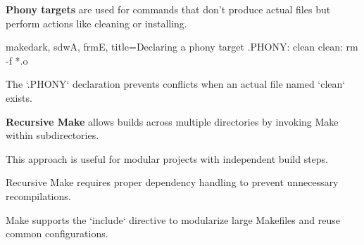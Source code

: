 \begin{NxSSSSBox}
	\begin{NxIDBox}
		\textbf{Phony targets} are used for commands that don’t produce actual files but perform actions like cleaning or installing.
	\end{NxIDBox}
\end{NxSSSSBox}

\begin{NxCodeBox}{make}{dark, sdwA, frmE, title={Declaring a phony target}}
	.PHONY: clean
	clean:
		rm -f *.o
\end{NxCodeBox}

\bigskip

\begin{NxSSSSBox}[breakable]
	\begin{NxIDBox}
		The `.PHONY` declaration prevents conflicts when an actual file named `clean` exists.
	\end{NxIDBox}
\end{NxSSSSBox}

\begin{NxSSSSBox}
	\begin{NxIDBox}
		\textbf{Recursive Make} allows builds across multiple directories by invoking Make within subdirectories.
	\end{NxIDBox}
	\begin{NxIDBox}
		This approach is useful for modular projects with independent build steps.
	\end{NxIDBox}
\end{NxSSSSBox}


\bigskip

\begin{NxSSSSBox}[breakable]
	\begin{NxIDBox}
		Recursive Make requires proper dependency handling to prevent unnecessary recompilations.
	\end{NxIDBox}
\end{NxSSSSBox}

\begin{NxSSSSBox}
	\begin{NxIDBox}
		Make supports the `include` directive to modularize large Makefiles and reuse common configurations.
	\end{NxIDBox}
\end{NxSSSSBox}


